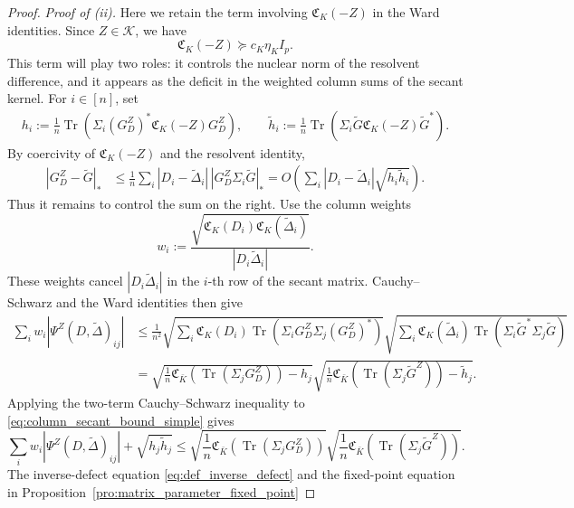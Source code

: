 \documentclass[EJP, preprint, NODS, nobera, nofontexpansion]{ejpecp}
\DeclareMathOperator{\tr}{Tr}
\begin{document}
\begin{proof}
\noindent
\emph{Proof of \textnormal{(ii)}.}
Here we retain the term involving
\(\mathfrak C_K(-Z)\) in the Ward identities.
Since \(Z\in\mathcal K\), we have
\[
    \mathfrak C_K(-Z)
    \succeq c_K\eta_KI_p.
\]
This term will play two roles: it controls the nuclear norm of the
resolvent difference, and it appears as the deficit in the weighted column sums of
the secant kernel.
For \(i\in[n]\), set
\begin{align*}
    h_i
    :=
    \frac1n
    \tr\!\left(
        \Sigma_i(G_D^Z)^*\mathfrak C_K(-Z)G_D^Z
    \right),
    \qquad 
    \widetilde h_i
    :=
    \frac1n
    \tr\!\left(
        \Sigma_i\widetilde G \mathfrak C_K(-Z)\widetilde G^*
    \right).
\end{align*}
By coercivity of \(\mathfrak C_K(-Z)\) and the resolvent identity,
\begin{align}
\label{eq:nuclear_transfer_hi}
|G_D^Z-\widetilde G|_*
&\leq
\frac1n\sum_i
|D_i-\widetilde\Delta_i|\,
|G_D^Z\Sigma_i\widetilde G|_*
=
O\left(
\sum_i |D_i-\widetilde\Delta_i|\sqrt{h_i\widetilde h_i}
\right).
\end{align}
Thus it remains to control the sum on the right.
Use the column weights
\[
    w_i
    :=
    \frac{
        \sqrt{\mathfrak C_K(D_i)\mathfrak C_K(\widetilde\Delta_i)}
    }{
        |D_i\widetilde\Delta_i|
    }.
\]
These weights cancel \(|D_i\widetilde\Delta_i|\) in the \(i\)-th row
of the secant matrix. Cauchy--Schwarz and the Ward identities then give
\begin{align}
\label{eq:column_secant_bound_simple}
\sum_i
w_i
|\Psi^Z(D,\widetilde\Delta)_{ij}|
&\leq \frac1{n^2} \sqrt{
\sum_i
\mathfrak C_K(D_i)
\tr\left(
\Sigma_iG_D^Z
\Sigma_j(G_D^Z)^*
\right)}\sqrt{\sum_i
\mathfrak C_K(\widetilde\Delta_i)
\tr\left(
\Sigma_i\widetilde G^*
\Sigma_j\widetilde G
\right)} \nonumber\\
&=
\sqrt{
\frac1n\mathfrak C_{\bar K}(\tr(\Sigma_jG_D^Z))-h_j
}
\sqrt{
\frac1n\mathfrak C_{\bar K}(\tr(\Sigma_j\widetilde G^Z))-\widetilde h_j
}.
\end{align}
Applying the two-term Cauchy--Schwarz inequality to
\eqref{eq:column_secant_bound_simple} gives
\begin{equation}
\sum_i
w_i|\Psi^Z(D,\widetilde\Delta)_{ij}|
+
\sqrt{h_j\widetilde h_j}
    \leq
\sqrt{
\frac1n\mathfrak C_{\bar K}(\tr(\Sigma_jG_D^Z))
}
\sqrt{
\frac1n\mathfrak C_{\bar K}(\tr(\Sigma_j\widetilde G^Z))
}.
\end{equation}
The inverse-defect equation \eqref{eq:def_inverse_defect} and the
fixed-point equation in Proposition~\ref{pro:matrix_parameter_fixed_point}

\end{proof}
\end{document}
